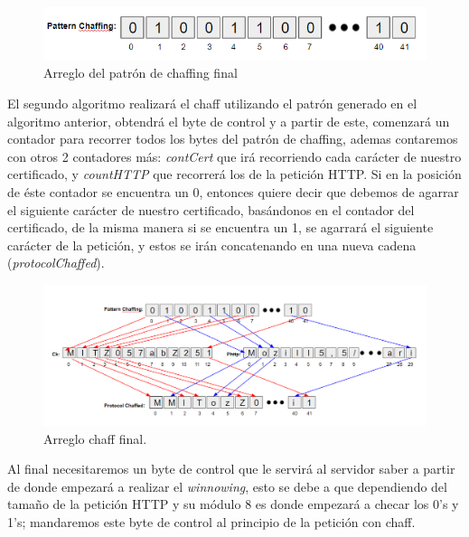 \documentclass[12pt, a4paper, titlepage]{report}
\begin{document}
        		\begin{figure}[H]
        			\begin{center}	                  \includegraphics[width=14cm]{./imagenes/Disenio/Componente_1/algorithm1_3.png}
    				\caption{Arreglo del patrón de chaffing final}
        			\end{center}
        		\end{figure}
    		    
    		    El segundo algoritmo realizará el chaff utilizando el patrón generado en el algoritmo anterior, obtendrá el byte de control y a partir de este, comenzará un contador para recorrer todos los bytes del patrón de chaffing, ademas contaremos con otros 2 contadores más: \textit{contCert} que irá recorriendo cada carácter de nuestro certificado, y \textit{countHTTP} que recorrerá los de la petición HTTP. Si en la posición de éste contador se encuentra un 0, entonces quiere decir que debemos de agarrar el siguiente carácter de nuestro certificado, basándonos en el contador del certificado, de la misma manera si se encuentra un 1, se agarrará el siguiente carácter de la petición, y estos se irán concatenando en una nueva cadena (\textit{protocolChaffed}). 
    		    
    		    \begin{figure}[H]
        			\begin{center}	                  \includegraphics[width=14cm]{./imagenes/Disenio/Componente_1/algorithm2_1.png}
    				\caption{Arreglo chaff final.}
        			\end{center}
        		\end{figure}
    		    
    		    Al final necesitaremos un byte de control que le servirá al servidor saber a partir de donde empezará a realizar el \textit{winnowing}, esto se debe a que dependiendo del tamaño de la petición HTTP y su módulo 8 es donde empezará a checar los 0's y 1's; mandaremos este byte de control al principio de la petición con chaff.\\
    		    
\end{document}
